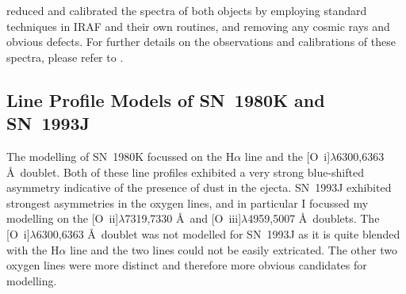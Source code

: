 \citet{Milisavljevic2012} reduced and calibrated the spectra of both objects by employing
standard techniques in IRAF and their own routines, and removing any cosmic rays and obvious defects. For further details on the observations and calibrations of these spectra, please refer to \citet{Milisavljevic2012}. 

\subsection{Line Profile Models of SN~1980K and SN~1993J}

The modelling of SN~1980K focussed on the H$\alpha$ line and the [O~{\sc i}]$\lambda$6300,6363 \AA\  doublet.  Both of these line profiles exhibited a very strong blue-shifted asymmetry indicative of the presence of dust in the ejecta.  SN~1993J exhibited strongest asymmetries in the oxygen lines, and in particular I focussed my modelling on the [O~{\sc ii}]$\lambda$7319,7330 \AA\  and [O~{\sc iii}]$\lambda$4959,5007 \AA\  doublets.  The [O~{\sc i}]$\lambda$6300,6363 \AA\ doublet was not modelled for SN~1993J as it is quite blended with the H$\alpha$ line and the two lines could not be easily extricated.  The other two oxygen lines were more distinct and therefore more obvious candidates for modelling.

